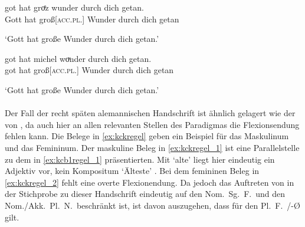 \begin{exe}
\ex \label{ex:kcc1akkpln0}
	\begin{xlist}
	\ex \label{ex:kcc1akkpln0_1}
		\gll got hat groͤz wunder durch dich getan. \\
			Gott hat groß[\textsc{acc.pl.\NeutI}] Wunder durch dich getan \\
		\begin{taggedline}{\parencites%
			[\pno~72\ra, 38]{kc:C1}[vgl.]%
			[\pno~82\rb, 35]{kc:K}%
			[\pno~279\ra, 17]{kc:Z}%
			[13778]{schroeder1895}%
		}
		\trans `Gott hat große Wunder durch dich getan.'
		\end{taggedline}

	\ex \label{ex:kcc1akkpln0_2}
		\gll got hat michel woͮnder durch dich getan. \\
			 got hat groß[\textsc{acc.pl.\NeutI}] Wunder durch dich getan \\
		\begin{taggedline}{\parencites%
			[\pno~59\va, 14]{kc:A1}[vgl.]%
			[\pno~105\rb, 21]{kc:M}%
			[\pno~83\vb, 28]{kc:H}%
			[\pno~36a\vc, 24]{kc:B1}%
			[\pno~93\vb, 32]{kc:VB}%
			[13778]{schroeder1895}%
		}
		\trans `Gott hat große Wunder durch dich getan.'
		\end{taggedline}
	\end{xlist}
\end{exe}

\paragraph{\citet{kc:K}}
Der Fall der recht späten alemannischen Handschrift \citet{kc:K} ist ähnlich
gelagert wie der von \citet{kc:C1}, da auch hier an allen relevanten Stellen
des Paradigmas die Flexionsendung fehlen kann. Die Belege in \cref{ex:kckregel}
geben ein Beispiel für das Maskulinum und das Femininum. Der maskuline Beleg in
\cref{ex:kckregel_1} ist eine Parallelstelle zu dem in \cref{ex:kcb1regel_1}
präsentierten. Mit  `alte' liegt hier eindeutig ein Adjektiv
vor, kein Kompositum  `Älteste'
\autocite[vgl.][\pno~\textit{althêrre}]{mwb1}. Bei dem femininen Beleg in
\cref{ex:kckregel_2} fehlt eine overte Flexionendung.
Da jedoch das Auftreten von  in der Stichprobe zu dieser Handschrift
eindeutig auf den Nom.\ Sg.\ F.\ und den Nom./Akk.\ Pl.\ N.\ beschränkt ist,
ist davon auszugehen, dass für den Pl.~F.\ /-Ø gilt.

